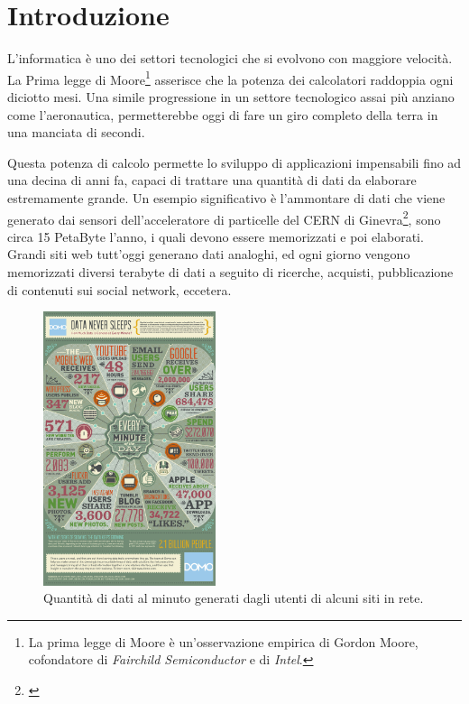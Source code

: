 
\chapter{Introduzione}\label{cap:introduzione}
L'informatica è uno dei settori tecnologici che si evolvono con maggiore velocità. La Prima legge di Moore\footnote{La prima legge di Moore è un'osservazione empirica di Gordon Moore, cofondatore di \emph{Fairchild Semiconductor} e di \emph{Intel}.} asserisce che la potenza dei calcolatori raddoppia ogni diciotto mesi. Una simile progressione in un settore tecnologico assai più anziano come l'aeronautica, permetterebbe oggi di fare un giro completo della terra in una manciata di secondi. 

Questa potenza di calcolo permette lo sviluppo di applicazioni impensabili fino ad una decina di anni fa, capaci di trattare una quantità di dati da elaborare estremamente grande. Un esempio significativo è l'ammontare di dati che viene generato dai sensori dell'acceleratore di particelle del CERN di Ginevra\footnote{\cite{pres_cern}}, sono circa 15 PetaByte l'anno, i quali devono essere memorizzati e poi elaborati. Grandi siti web tutt'oggi generano dati analoghi, ed ogni giorno vengono memorizzati diversi terabyte di dati a seguito di ricerche, acquisti, pubblicazione di contenuti sui social network, eccetera. 
\begin{figure}
	\centering
	\includegraphics[width=0.45\textwidth]{img/Data-in-One-Minute.jpg}
	\caption{Quantità di dati al minuto generati dagli utenti di alcuni siti in rete.}
	\label{img:dpm}
\end{figure}
